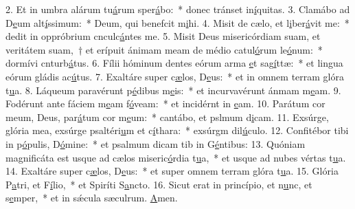 2. Et in umbra alárum tu\uline{á}rum sper\uline{á}bo:~* donec tránset in\uline{í}quitas.
3. Clamábo ad D\uline{e}um alt\uline{í}ssimum:~* Deum, qui benefcit m\uline{i}hi.
4. Misit de cælo, et l\uline{i}ber\uline{á}vit me:~* dedit in oppróbrium cnculc\uline{á}ntes me.
5. Misit Deus misericórdiam suam, et veritátem suam,~† et erípuit ánimam meam de médio catul\uline{ó}rum le\uline{ó}num:~* dormívi cnturb\uline{á}tus.
6. Fílii hóminum dentes eórum arma \uline{e}t sag\uline{í}ttæ:~* et lingua eórum gládis ac\uline{ú}tus.
7. Exaltáre super c\uline{æ}los, D\uline{e}us:~* et in omnem terram glóra t\uline{u}a.
8. Láqueum paravérunt p\uline{é}dibus m\uline{e}is:~* et incurvavérunt ánmam m\uline{e}am.
9. Fodérunt ante fáciem m\uline{e}am f\uline{ó}veam:~* et incidérnt in \uline{e}am.
10. Parátum cor meum, Deus, par\uline{á}tum cor m\uline{e}um:~* cantábo, et pslmum d\uline{i}cam.
11. Exsúrge, glória mea, exsúrge psaltéri\uline{u}m et c\uline{í}thara:~* exsúrgm dil\uline{ú}culo.
12. Confitébor tibi in p\uline{ó}pulis, D\uline{ó}mine:~* et psalmum dicam tib in G\uline{é}ntibus:
13. Quóniam magnificáta est usque ad cælos miseric\uline{ó}rdia t\uline{u}a,~* et usque ad nubes vértas t\uline{u}a.
14. Exaltáre super c\uline{æ}los, D\uline{e}us:~* et super omnem terram glóra t\uline{u}a.
15. Glória P\uline{a}tri, et F\uline{í}lio,~* et Spiríti S\uline{a}ncto.
16. Sicut erat in princípio, et n\uline{u}nc, et s\uline{e}mper,~* et in sǽcula sæculrum. \uline{A}men.
